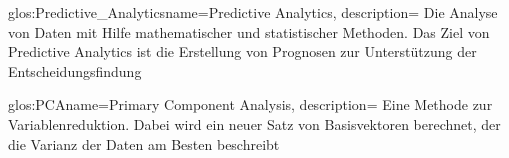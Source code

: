 





\newglossaryentry
{glos:Predictive_Analytics}{name=Predictive Analytics, description=
{Die Analyse von Daten mit Hilfe mathematischer und statistischer Methoden.
Das Ziel von Predictive Analytics ist die Erstellung von Prognosen zur
Unterstützung der Entscheidungsfindung}
}

\newglossaryentry
{glos:PCA}{name=Primary Component Analysis, description=
{Eine Methode zur Variablenreduktion. Dabei wird ein neuer Satz von
Basisvektoren berechnet, der die Varianz der Daten am Besten beschreibt}
}
